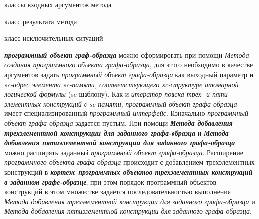 \begin{SCn}
\begin{scnindent}
\end{scnindent}
\begin{scnrelfromvector}{классы входных аргументов метода}
\end{scnrelfromvector}
\begin{scnrelfromlist}{класс результата метода}
\end{scnrelfromlist}
\begin{scnrelfromlist}{класс исключительных ситуаций}
\end{scnrelfromlist}
\end{SCn}

\textbf{\textit{программный объект граф-образца}} можно сформировать при помощи \textit{Метода создания программного объекта графа-образца}, для этого необходимо в качестве аргументов задать \textit{программный объект графа-образца} как выходный параметр и \textit{sc-адрес элемента sc-памяти, соответствующего sc-структуре} \textit{атомарной логической формулы} (sc-шаблону).
Как и \textit{итератор поиска трех- и пяти- элементных конструкций в sc-памяти}, \textit{программный объект графа-образца} имеет специализированный \textit{программный интерфейс}. Изначально \textit{программный объект графа-образца} задается пустым. При помощи \textbf{\textit{Метода добавления трехэлементной конструкции для заданного графа-образца}} и \textbf{\textit{Метода добавления пятиэлементной конструкции для заданного графа-образца}} можно расширять заданный \textit{программный объект графа-образца}. Расширение \textit{программного объекта графа-образца} происходит с добавлением трехэлементных конструкций в \textbf{\textit{кортеж программных объектов трехэлементных конструкций в заданном графе-образце}}, при этом порядок программный объектов конструкций в этом множестве задается последовательностью выполнения \textit{Метода добавления трехэлементной конструкции для заданного графа-образца} и \textit{Метода добавления пятиэлементной конструкции для заданного графа-образца}.

